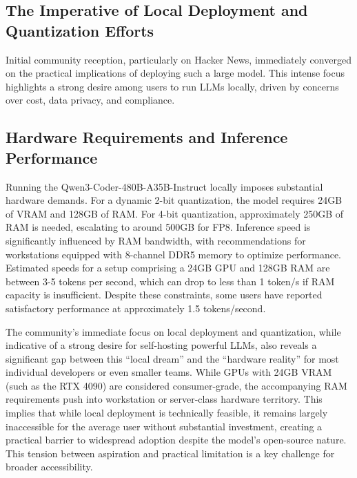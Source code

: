 \subsection{The Imperative of Local Deployment and Quantization Efforts}

Initial community reception, particularly on Hacker News, immediately converged on the practical implications of deploying such a large model.\cite{hackernews_qwen3coder_2025} This intense focus highlights a strong desire among users to run LLMs locally, driven by concerns over cost, data privacy, and compliance.\cite{svenson_qwen3coder_medium_2025, llmstats_claude_qwen3_2025, hackernews_qwen3coder_2025, reddit_localllama_qwen3coder_1_2025, unsloth_qwen3coder_local_2025, datacamp_qwen3_features_2025, reddit_localllama_kimi_qwen3coder_2025}

\subsection{Hardware Requirements and Inference Performance}

Running the Qwen3-Coder-480B-A35B-Instruct locally imposes substantial hardware demands. For a dynamic 2-bit quantization, the model requires 24GB of VRAM and 128GB of RAM. For 4-bit quantization, approximately 250GB of RAM is needed, escalating to around 500GB for FP8.\cite{hackernews_qwen3coder_2025} Inference speed is significantly influenced by RAM bandwidth, with recommendations for workstations equipped with 8-channel DDR5 memory to optimize performance.\cite{hackernews_qwen3coder_2025} Estimated speeds for a setup comprising a 24GB GPU and 128GB RAM are between 3-5 tokens per second, which can drop to less than 1 token/s if RAM capacity is insufficient.\cite{hackernews_qwen3coder_2025} Despite these constraints, some users have reported satisfactory performance at approximately 1.5 tokens/second.\cite{hackernews_qwen3coder_2025, reddit_localllama_kimi_qwen3coder_2025}

The community's immediate focus on local deployment and quantization, while indicative of a strong desire for self-hosting powerful LLMs, also reveals a significant gap between this ``local dream'' and the ``hardware reality'' for most individual developers or even smaller teams. While GPUs with 24GB VRAM (such as the RTX 4090) are considered consumer-grade, the accompanying RAM requirements push into workstation or server-class hardware territory. This implies that while local deployment is technically feasible, it remains largely inaccessible for the average user without substantial investment, creating a practical barrier to widespread adoption despite the model's open-source nature. This tension between aspiration and practical limitation is a key challenge for broader accessibility.

